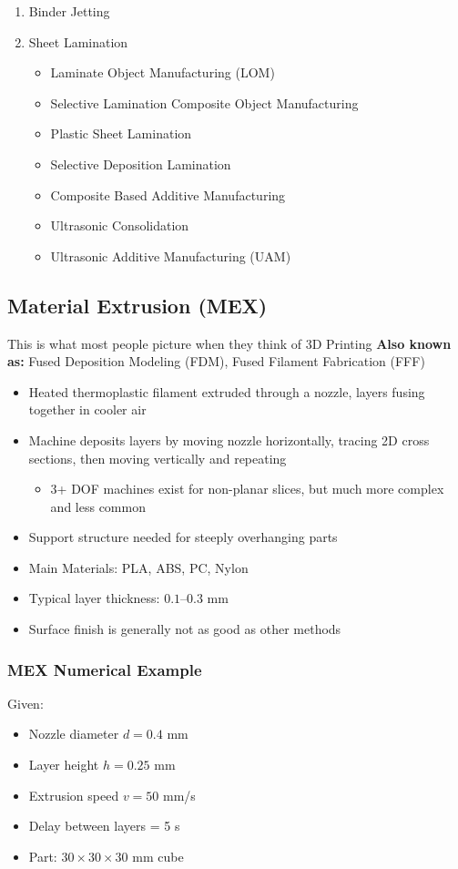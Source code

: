 \documentclass{article}
\begin{document}
\begin{enumerate}
\begin{itemize}
    \end{itemize}
    \item Binder Jetting
    \item Sheet Lamination 
    \begin{itemize}
        \item Laminate Object Manufacturing (LOM)
        \item Selective Lamination Composite Object Manufacturing
        \item Plastic Sheet Lamination
        \item Selective Deposition Lamination
        \item Composite Based Additive Manufacturing
        \item Ultrasonic Consolidation
        \item Ultrasonic Additive Manufacturing (UAM)
    \end{itemize}
\end{enumerate}

\subsection{Material Extrusion (MEX)}
This is what most people picture when they think of 3D Printing
\textbf{Also known as:} Fused Deposition Modeling (FDM), Fused Filament Fabrication (FFF)

\begin{itemize}
    \item Heated thermoplastic filament extruded through a nozzle, layers fusing together in cooler air
    \item Machine deposits layers by moving nozzle horizontally, tracing 2D cross sections, then moving vertically and repeating
    \begin{itemize}
        \item 3+ DOF machines exist for non-planar slices, but much more complex and less common
    \end{itemize}
    \item Support structure needed for steeply overhanging parts
    \item Main Materials: PLA, ABS, PC, Nylon
    \item Typical layer thickness: $0.1$–$0.3$ mm
    \item Surface finish is generally not as good as other methods
\end{itemize}

\subsubsection{MEX Numerical Example}
Given:
\begin{itemize}
    \item Nozzle diameter $d = 0.4$ mm
    \item Layer height $h = 0.25$ mm
    \item Extrusion speed $v = 50$ mm/s
    \item Delay between layers = 5 s
    \item Part: $30 \times 30 \times 30$ mm cube
\end{itemize}
\end{document}
